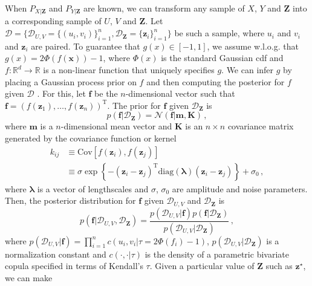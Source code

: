 \documentclass{article}
\begin{document}
When $P_{X|\mathbf{Z}}$ and $P_{Y|\mathbf{Z}}$ are known, we can transform any
sample of $X$, $Y$ and $\mathbf{Z}$ into a corresponding sample of $U$, $V$ and
$\mathbf{Z}$.  Let $\mathcal{D} = \{ \mathcal{D}_{U,V} = \{(u_i,
v_i)\}_{i=1}^n, \mathcal{D}_\mathbf{Z} = \{\mathbf{z}_i\}_{i=1}^n\}$ be such a
sample, where $u_i$ and $v_i$ and $\mathbf{z}_i$ are paired.  To guarantee that
$g(x) \in [-1,1]$, we assume w.l.o.g. that $g(x) = 2\Phi(f(\textbf{x})) - 1$, where
$\Phi(x)$ is the standard Gaussian cdf and $f:\mathbb{R}^d\rightarrow
\mathbb{R}$ is a non-linear function that uniquely specifies $g$. We can
infer $g$ by placing a Gaussian process prior on $f$ and then computing the
posterior for $f$ given $\mathcal{D}$ \cite{Rasmussen2006}. For this, let
$\mathbf{f}$ be the $n$-dimensional vector such that
$\mathbf{f}=(f(\mathbf{z}_1),\ldots,f(\mathbf{z}_n))^\text{T}$.  The prior for
$\mathbf{f}$ given $\mathcal{D}_\mathbf{Z}$ is \begin{equation}
p(\mathbf{f}|\mathcal{D}_\mathbf{Z}) =
\mathcal{N}(\mathbf{f}|\mathbf{m},\mathbf{K})\,,\label{eq:gpPrior}
\end{equation} where $\mathbf{m}$ is a $n$-dimensional mean vector and
$\mathbf{K}$ is an $n \times n$ covariance matrix generated by the covariance
function or kernel
\begin{align}
k_{ij} & \equiv \text{Cov}[f(\mathbf{z}_i), f(\mathbf{z}_j)] \nonumber \\
& \equiv  \sigma \exp \left\{ - (\mathbf{z}_i - \mathbf{z}_j)^\text{T}
\text{diag}(\boldsymbol{\lambda}) (\mathbf{z}_i - \mathbf{z}_j)\right\} + \sigma_0\,,\label{eq:covariance}
\end{align}
where $\boldsymbol{\lambda}$ is a vector of lengthscales and $\sigma$, $\sigma_0$ are
amplitude and noise parameters.  Then, the posterior distribution for
$\mathbf{f}$ given $\mathcal{D}_{U,V}$ and $\mathcal{D}_{\mathbf{Z}}$ is
\begin{equation}
p(\mathbf{f}|\mathcal{D}_{U,V},\mathcal{D}_\mathbf{Z}) =
\frac{p(\mathcal{D}_{U,V}|\mathbf{f})p(\mathbf{f}|\mathcal{D}_\mathbf{Z})}{p(\mathcal{D}_{U,V}|\mathcal{D}_{\mathbf{Z}})}\,,
\label{eq:posterior}
\end{equation}
where $p(\mathcal{D}_{U,V}|\mathbf{f}) = \prod_{i=1}^n c(u_i,v_i|\tau =
2\Phi(f_i) - 1)$, $p(\mathcal{D}_{U,V}|\mathcal{D}_{\mathbf{Z}})$ is a
normalization constant and $c(\cdot, \cdot | \tau)$ is the density of a
parametric bivariate copula specified in terms of Kendall's $\tau$.  Given a
particular value of $\mathbf{Z}$ such as $\mathbf{z}^\star$, we can make
\end{document}
